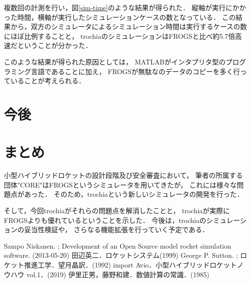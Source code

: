 \documentclass[a4j,10pt]{jsarticle}
\begin{document}
複数回の計測を行い，図\ref{sim-time}のような結果が得られた．
縦軸が実行にかかった時間，横軸が実行したシミュレーションケースの数となっている．
この結果から，双方のシミュレータによるシミュレーション時間は実行するケースの数にほぼ比例することと，
trochiaのシミュレーションはFROGSと比べ約5.7倍高速だということが分かった．

このような結果が得られた原因としては，
MATLABがインタプリタ型のプログラミング言語であることに加え，
FROGSが無駄なのデータのコピーを多く行っていることが考えられる．

\section{今後}

\section{まとめ}

小型ハイブリッドロケットの設計段階及び安全審査において，
筆者の所属する団体"CORE"はFROGSというシミュレータを用いてきたが，
これには様々な問題点があった．
そのため，trochiaという新しいシミュレータの開発を行った．

そして，今回trochiaがそれらの問題点を解消したことと，
trochiaが実際にFROGSよりも優れているということを示した．
今後は，trochiaのシミュレーションの妥当性検証や，
さらなる機能拡張を行っていく予定である．

% 
% 

\begin{thebibliography}{99}
		Sampo Niskanen. ; Development of an Open Source model rocket simulation software. (2013-05-20)
		田辺英二．ロケットシステム(1999)
		George P. Sutton. ; ロケット推進工学．望月晶訳．(1992)
		import Avio．小型ハイブリッドロケットノウハウ vol.1．(2019)
		伊里正男，藤野和建．数値計算の常識．(1985)
\end{thebibliography}
\end{document}
